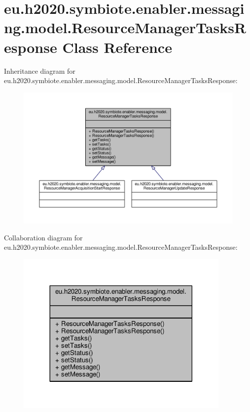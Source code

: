 \hypertarget{classeu_1_1h2020_1_1symbiote_1_1enabler_1_1messaging_1_1model_1_1ResourceManagerTasksResponse}{}\section{eu.\+h2020.\+symbiote.\+enabler.\+messaging.\+model.\+Resource\+Manager\+Tasks\+Response Class Reference}
\label{classeu_1_1h2020_1_1symbiote_1_1enabler_1_1messaging_1_1model_1_1ResourceManagerTasksResponse}


Inheritance diagram for eu.\+h2020.\+symbiote.\+enabler.\+messaging.\+model.\+Resource\+Manager\+Tasks\+Response\+:
\nopagebreak
\begin{figure}[H]
\begin{center}
\leavevmode
\includegraphics[width=350pt]{classeu_1_1h2020_1_1symbiote_1_1enabler_1_1messaging_1_1model_1_1ResourceManagerTasksResponse__inherit__graph}
\end{center}
\end{figure}


Collaboration diagram for eu.\+h2020.\+symbiote.\+enabler.\+messaging.\+model.\+Resource\+Manager\+Tasks\+Response\+:
\nopagebreak
\begin{figure}[H]
\begin{center}
\leavevmode
\includegraphics[width=296pt]{classeu_1_1h2020_1_1symbiote_1_1enabler_1_1messaging_1_1model_1_1ResourceManagerTasksResponse__coll__graph}
\end{center}
\end{figure}
